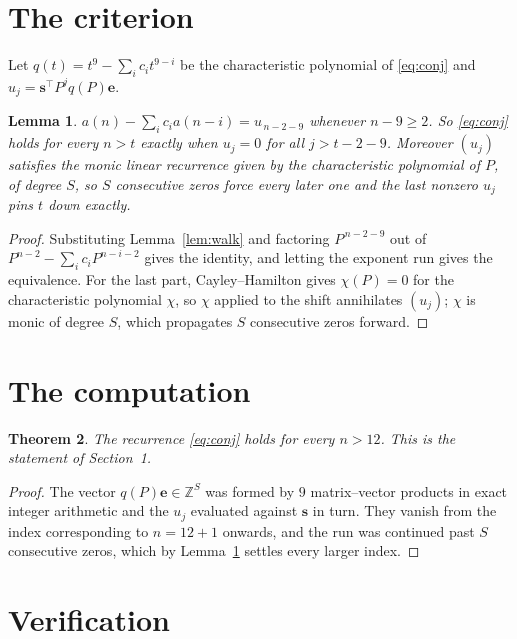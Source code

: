 \documentclass[11pt,a4paper]{article}
\theoremstyle{plain}
\newtheorem{theorem}{Theorem}
\newtheorem{lemma}[theorem]{Lemma}
\theoremstyle{definition}
\begin{document}
\section{The criterion}

Let $q(t)=t^{9}-\sum_i c_i t^{9-i}$ be the characteristic polynomial of
\eqref{eq:conj} and $u_j=\mathbf{s}^{\!\top}P^{j}q(P)\mathbf{e}$.

\begin{lemma}\label{lem:crit}
$a(n)-\sum_i c_i a(n-i)=u_{\,n-2-9}$ whenever $n-9\ge2$. So \eqref{eq:conj}
holds for every $n>t$ exactly when $u_j=0$ for all $j>t-2-9$. Moreover $(u_j)$
satisfies the monic linear recurrence given by the characteristic polynomial of $P$, of
degree $S$, so $S$ consecutive zeros force every later one and the last nonzero $u_j$ pins
$t$ down exactly.
\end{lemma}

\begin{proof}
Substituting Lemma~\ref{lem:walk} and factoring $P^{\,n-2-9}$ out of
$P^{n-2}-\sum_i c_i P^{n-i-2}$ gives the identity, and letting the exponent run gives the
equivalence. For the last part, Cayley--Hamilton gives $\chi(P)=0$ for the characteristic
polynomial $\chi$, so $\chi$ applied to the shift annihilates $(u_j)$; $\chi$ is monic of
degree $S$, which propagates $S$ consecutive zeros forward.
\end{proof}

\section{The computation}

\begin{theorem}
The recurrence \eqref{eq:conj} holds for every $n>12$. This is the statement of
Section~1.
\end{theorem}

\begin{proof}
The vector $q(P)\mathbf{e}\in\mathbb{Z}^{S}$ was formed by $9$ matrix--vector
products in exact integer arithmetic and the $u_j$ evaluated against $\mathbf{s}$ in turn.
They vanish from the index corresponding to $n=12+1$ onwards, and the run was continued
past $S$ consecutive zeros, which by Lemma~\ref{lem:crit} settles every larger index.
\end{proof}

\section{Verification}
\end{document}
